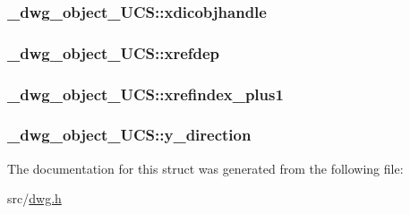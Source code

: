 \hypertarget{struct__dwg__object__UCS_a6a7037dd96be1b4856ae3f3baf94a7c4}{
\subsubsection[{xdicobjhandle}]{ {\bf \-\_\-dwg\-\_\-object\-\_\-\-U\-C\-S\-::xdicobjhandle}}}\label{struct__dwg__object__UCS_a6a7037dd96be1b4856ae3f3baf94a7c4}
\hypertarget{struct__dwg__object__UCS_a8985e3f4bd8664f65dd48717145659a7}{
\subsubsection[{xrefdep}]{ {\bf \-\_\-dwg\-\_\-object\-\_\-\-U\-C\-S\-::xrefdep}}}\label{struct__dwg__object__UCS_a8985e3f4bd8664f65dd48717145659a7}
\hypertarget{struct__dwg__object__UCS_a231c19b7fd8920cb228e07774ec287a7}{
\subsubsection[{xrefindex\-\_\-plus1}]{ {\bf \-\_\-dwg\-\_\-object\-\_\-\-U\-C\-S\-::xrefindex\-\_\-plus1}}}\label{struct__dwg__object__UCS_a231c19b7fd8920cb228e07774ec287a7}
\hypertarget{struct__dwg__object__UCS_acbed84011f92a7e6404a237852cf51f0}{
\subsubsection[{y\-\_\-direction}]{ {\bf \-\_\-dwg\-\_\-object\-\_\-\-U\-C\-S\-::y\-\_\-direction}}}\label{struct__dwg__object__UCS_acbed84011f92a7e6404a237852cf51f0}


\-The documentation for this struct was generated from the following file\-:\begin{DoxyCompactItemize}
\item 
src/\hyperlink{dwg_8h}{dwg.\-h}\end{DoxyCompactItemize}
